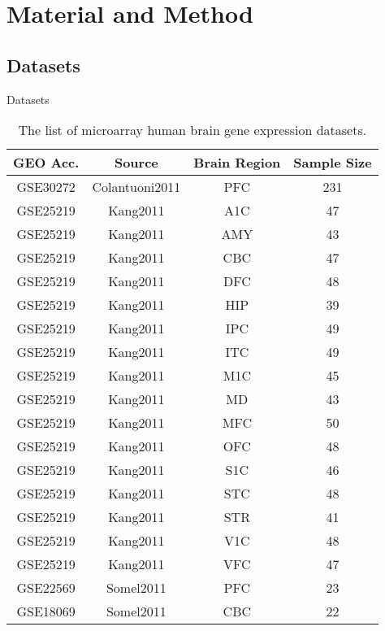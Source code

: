\chapter{Material and Method}
\label{chp:b2}

\section{Datasets}
Datasets


\begin{table}[ht]
\centering
\caption{The list of microarray human brain gene expression datasets.}
\label{table:table1}
\begin{tabular}{|c c c c|}
 \hline
 \textbf{GEO Acc.} & \textbf{Source} & \textbf{Brain Region} & \textbf{Sample Size} \\ [0.5ex] 
 \hline\hline
 GSE30272 & Colantuoni2011 & PFC & 231 \\ 
 \hline
 GSE25219 & Kang2011 & A1C & 47 \\
 \hline
 GSE25219 & Kang2011 & AMY & 43 \\
 \hline
 GSE25219 & Kang2011 & CBC & 47 \\
 \hline
 GSE25219 & Kang2011 & DFC & 48 \\
 \hline
 GSE25219 & Kang2011 & HIP & 39 \\
 \hline
 GSE25219 & Kang2011 & IPC & 49 \\
 \hline
 GSE25219 & Kang2011 & ITC & 49 \\
 \hline
 GSE25219 & Kang2011 & M1C & 45 \\
 \hline
 GSE25219 & Kang2011 & MD & 43 \\
 \hline
 GSE25219 & Kang2011 & MFC & 50 \\
 \hline
 GSE25219 & Kang2011 & OFC & 48 \\
 \hline
 GSE25219 & Kang2011 & S1C & 46 \\
 \hline
 GSE25219 & Kang2011 & STC & 48 \\
 \hline
 GSE25219 & Kang2011 & STR & 41 \\
 \hline
 GSE25219 & Kang2011 & V1C & 48 \\
 \hline
 GSE25219 & Kang2011 & VFC & 47 \\
 \hline
 GSE22569 & Somel2011 & PFC & 23 \\
 \hline
 GSE18069 & Somel2011 & CBC & 22 \\
\hline
\end{tabular}

\end{table}



